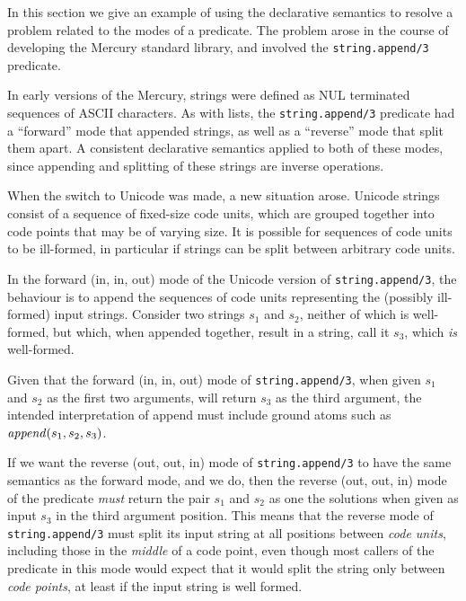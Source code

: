 In this section we give an example
of using the declarative semantics to resolve a problem
related to the modes of a predicate.
The problem arose in the course of developing the Mercury standard library,
and involved the \texttt{string.append/3} predicate.

In early versions of the Mercury,
strings were defined as NUL terminated sequences of ASCII characters.
As with lists,
the \texttt{string.append/3} predicate had
a ``forward'' mode that appended strings,
as well as a ``reverse'' mode that split them apart.
A consistent declarative semantics applied to both of these modes,
since appending and splitting of these strings
are inverse operations.

When the switch to Unicode was made,
a new situation arose.
Unicode strings consist of a sequence of fixed-size code units,
which are grouped together into code points
that may be of varying size.
It is possible for sequences of code units to be ill-formed,
in particular if strings can be split between arbitrary code units.

In the forward (in, in, out) mode
of the Unicode version of \texttt{string.append/3},
the behaviour is to append the sequences of code units representing
the (possibly ill-formed) input strings.
Consider two strings $s_1$ and $s_2$,
neither of which is well-formed,
but which, when appended together, result in a string,
call it $s_3$, which \emph{is} well-formed.

Given that the forward (in, in, out) mode of \texttt{string.append/3},
when given $s_1$ and $s_2$ as the first two arguments,
will return $s_3$ as the third argument,
the intended interpretation of append
must include ground atoms such as $\text{\textit{append}}(s_1, s_2, s_3)$.

If we want the reverse (out, out, in) mode of \texttt{string.append/3}
to have the same semantics as the forward mode, and we do,
then the reverse (out, out, in) mode of the predicate
\emph{must} return the pair $s_1$ and $s_2$ as one the solutions
when given as input $s_3$ in the third argument position.
This means that the reverse mode of \texttt{string.append/3}
must split its input string
at all positions between \emph{code units},
including those in the \emph{middle} of a code point,
even though most callers of the predicate in this mode
would expect that it would split the string only between \emph{code points},
at least if the input string is well formed.


